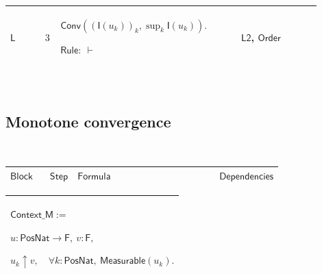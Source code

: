 \documentclass[12pt,reqno]{amsart}
\theoremstyle{blueplain}
\numberwithin{equation}{section}
\newlength{\FATOUOneColumnBody}
\begin{document}
{\scriptsize \setlength{\parskip}{0pt}\nointerlineskip
\noindent 
\begin{tabular}{|@{}>{\centering\arraybackslash}m{0.10658\linewidth}|>{\centering\arraybackslash}m{0.03553\linewidth}|>{\centering\arraybackslash}m{0.52105\linewidth}|>{\centering\arraybackslash}m{0.23684\linewidth}|}
\hline
\hypertarget{proof:L3}{$\displaystyle \mathsf{L}$} & $\displaystyle 3$ & $%
\displaystyle \mathsf{Conv}((\mathsf{I}(u_k))_k,\sup_k\mathsf{I}(u_k)).$\par$%
\displaystyle \mathsf{Rule}:\ \vdash$ & \hyperlink{proof:L2}{$\displaystyle 
\mathsf{L2}$}, \hyperlink{lem:Order}{$\displaystyle \mathsf{Order}$} \\ 
\hline
\end{tabular}%
}

{\scriptsize \ }

\subsection{\protect\scriptsize Monotone convergence}

{\scriptsize {\ }}

{\scriptsize \setlength{\parskip}{0pt}\nointerlineskip
\noindent 
\begin{tabular}{|@{}>{\centering\arraybackslash}m{\FATOUOneColumnBody}|}
\hline
$\displaystyle \mathsf{MCTProof}$ \\ \hline
\end{tabular}%
}

{\scriptsize \setlength{\parskip}{0pt}\nointerlineskip
\noindent 
\begin{tabular}{|@{}>{\centering\arraybackslash}m{0.10658\linewidth}|>{\centering\arraybackslash}m{0.03553\linewidth}|>{\centering\arraybackslash}m{0.52105\linewidth}|>{\centering\arraybackslash}m{0.23684\linewidth}|}
\hline
$\displaystyle \mathsf{Block}$ & $\displaystyle \mathsf{Step}$ & $%
\displaystyle \mathsf{Formula}$ & $\displaystyle \mathsf{Dependencies}$ \\ 
\hline
\end{tabular}%
}

{\scriptsize \setlength{\parskip}{0pt}\nointerlineskip
\noindent 
\begin{tabular}{|@{}>{\centering\arraybackslash}m{\FATOUOneColumnBody}|}
\hline
$\displaystyle \mathsf{Context\_M}:=$\par$\displaystyle u:\mathsf{PosNat}\to%
\mathsf{F},\ v:\mathsf{F},$\par$\displaystyle u_k\uparrow v,\quad\forall k:%
\mathsf{PosNat},\ \mathsf{Measurable}(u_k).$ \\ \hline
\end{tabular}%
}
\end{document}

